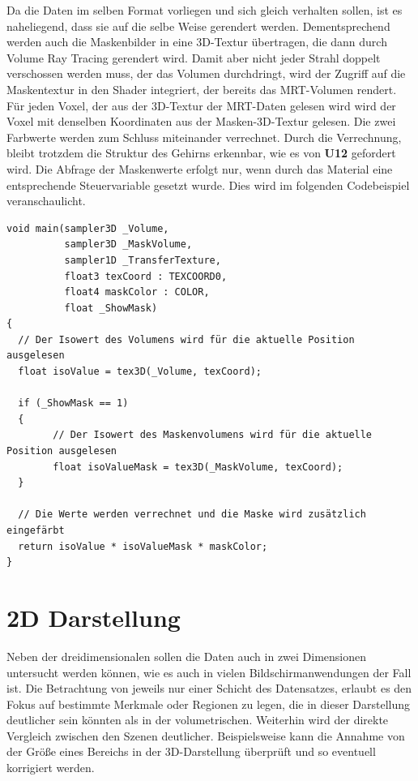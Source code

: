 Da die Daten im selben Format vorliegen und sich gleich verhalten sollen, ist es naheliegend, dass sie auf die selbe Weise gerendert werden. Dementsprechend werden auch die Maskenbilder in eine 3D-Textur übertragen, die dann durch Volume Ray Tracing gerendert wird. Damit aber nicht jeder Strahl doppelt verschossen werden muss, der das Volumen durchdringt, wird der Zugriff auf die Maskentextur in den Shader integriert, der bereits das MRT-Volumen rendert. Für jeden Voxel, der aus der 3D-Textur der MRT-Daten gelesen wird wird  der Voxel mit denselben Koordinaten aus der Masken-3D-Textur gelesen. Die zwei Farbwerte werden zum Schluss miteinander verrechnet. Durch die Verrechnung, bleibt trotzdem die Struktur des Gehirns erkennbar, wie es von \textbf{U12} gefordert wird. Die Abfrage der Maskenwerte erfolgt nur, wenn durch das Material eine entsprechende Steuervariable gesetzt wurde.
Dies wird im folgenden Codebeispiel veranschaulicht.

\begin{verbatim}
void main(sampler3D _Volume,
		  sampler3D _MaskVolume,
          sampler1D _TransferTexture,
          float3 texCoord : TEXCOORD0,
          float4 maskColor : COLOR,
          float _ShowMask)
{
  // Der Isowert des Volumens wird für die aktuelle Position ausgelesen
  float isoValue = tex3D(_Volume, texCoord);
  
  if (_ShowMask == 1)
  {
		// Der Isowert des Maskenvolumens wird für die aktuelle Position ausgelesen
		float isoValueMask = tex3D(_MaskVolume, texCoord);
  }
	
  // Die Werte werden verrechnet und die Maske wird zusätzlich eingefärbt
  return isoValue * isoValueMask * maskColor;
}
\end{verbatim}

\section{2D Darstellung}

Neben der dreidimensionalen sollen die Daten auch in zwei Dimensionen untersucht werden können, wie es auch in vielen Bildschirmanwendungen der Fall ist.
Die Betrachtung von jeweils nur einer Schicht des Datensatzes, erlaubt es den Fokus auf bestimmte Merkmale oder Regionen zu legen, die in dieser Darstellung deutlicher sein könnten als in der volumetrischen. Weiterhin wird der direkte Vergleich zwischen den Szenen deutlicher. Beispielsweise kann die Annahme von der Größe eines Bereichs in der 3D-Darstellung überprüft und so eventuell korrigiert werden.

